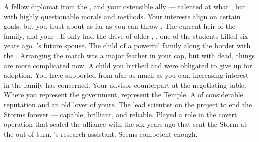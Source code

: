 \documentclass[char]{GL2020}
\begin{document}
\begin{contacts}
    \contact{\cEvil{}} A fellow diplomat from the \pFarm{}, and your ostensible ally — talented at what \cEvil{\theydo}, but with highly questionable morals and methods. Your interests align on certain goals, but you trust \cEvil{\them} about as far as you can throw \cEvil{\them}.
    \contact{\cHeir{}} The current heir of the \cHeir{\formal} family, and your \cHeir{\nibling}. If only \cHeir{\they} had the drive of \cHeir{\their} older \cHeirSibling{\sibling}, \cHeirSibling{}, one of the students killed six years ago.
    \contact{\cChupStudent{}} \cHeir{}'s future spouse. The child of a powerful \pFarm{} family along the border with the \pTech{}. Arranging the match was a major feather in your cap, but with \cHeirSibling{} dead, things are more complicated now.
    \contact{\cAmbition{}} A child you birthed and were obligated to give up for adoption. You have supported \cAmbition{\them} from afar as much as you can. \cAmbition{\Their} increasing interest in the \cHeir{\formal} family has \cFaledonParent{} concerned.
     \contact{\cAntiChup{}} Your advisor counterpart at the negotiating table. Where you represent the government, \cAntiChup{\they} represent\cAntiChup{\verbs} the Temple. A \cAntiChup{\cleric} of considerable reputation and an old lover of yours.
    \contact{\cHeadScientist{}} The lead scientist on the project to end the Storms forever — capable, brilliant, and reliable. Played a role in the covert operation that sealed the alliance with the \pFarm{} six years ago that sent the Storm at the \pShip{} out of turn.
    \contact{\cAssistantScientist{}} \cHeadScientist{}'s research assistant. Seems competent enough.
\end{contacts}
\end{document}

